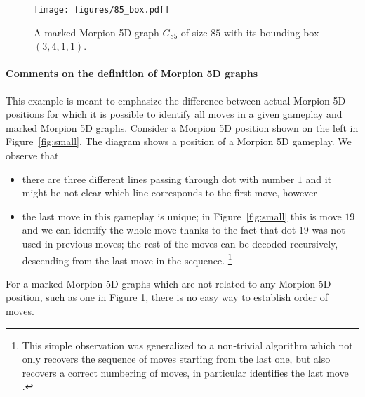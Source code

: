 \begin{figure}[h]
    \centering
    \texttt{[image: figures/85\_box.pdf]}
     \caption{
     A marked Morpion 5D graph $G_{85}$ of size $85$ with its bounding box $(3,4,1,1)$.
	}
    \label{fig:85}
\end{figure}

\paragraph*{Comments on the definition of Morpion 5D graphs}


\begin{example}
This example is meant to emphasize the difference between 
actual Morpion 5D positions for which it is possible to identify all moves in a given gameplay and marked Morpion 5D graphs.
Consider a Morpion 5D position shown on the left in Figure~\ref{fig:small}. %
The diagram shows a position of a Morpion 5D gameplay.
We observe that %
  \begin{itemize}
    \item   there are three different lines passing through dot with number $1$ and it might be not clear which line corresponds to the first move, however
    \item   the last move in this gameplay is unique; in Figure~\ref{fig:small} this is move $19$ and we can identify the whole move thanks to the fact  that dot $19$ was not used in previous moves; the rest of the moves can be decoded recursively, descending from the last move in the sequence. \footnote{This simple observation was generalized to a non-trivial algorithm which not only recovers the sequence of moves starting from the last one, but also recovers a correct numbering of moves, in particular identifies the last move \cite{demaine}.} %
  \end{itemize}
For a marked Morpion 5D graphs which are not related to any Morpion 5D position, such as one in Figure \ref{fig:85}, there is no easy way to establish order of moves.
\end{example}


